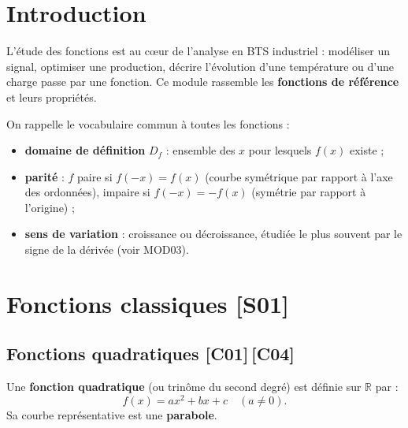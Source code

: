 \documentclass[a4paper,11pt]{article}
\begin{document}
\newpage
\tableofcontents
\newpage

\section{Introduction}

L'étude des fonctions est au cœur de l'analyse en BTS industriel : modéliser un signal, optimiser une production, décrire l'évolution d'une température ou d'une charge passe par une fonction. Ce module rassemble les \textbf{fonctions de référence} et leurs propriétés.

\begin{remarque}
On rappelle le vocabulaire commun à toutes les fonctions :
\begin{itemize}
  \item \textbf{domaine de définition} $D_f$ : ensemble des $x$ pour lesquels $f(x)$ existe ;
  \item \textbf{parité} : $f$ paire si $f(-x) = f(x)$ (courbe symétrique par rapport à l'axe des ordonnées), impaire si $f(-x) = -f(x)$ (symétrie par rapport à l'origine) ;
  \item \textbf{sens de variation} : croissance ou décroissance, étudiée le plus souvent par le signe de la dérivée (voir MOD03).
\end{itemize}
\end{remarque}

\newpage
\section{Fonctions classiques \hfill {\normalsize\color{uimmred}[S01]}}

\subsection{Fonctions quadratiques \hfill {\normalsize\color{uimmred}[C01]\,[C04]}}

\begin{definition}
Une \textbf{fonction quadratique} (ou trinôme du second degré) est définie sur $\mathbb{R}$ par :
\[
f(x) = a x^2 + b x + c \quad (a \neq 0).
\]
Sa courbe représentative est une \textbf{parabole}.
\end{definition}
\end{document}
